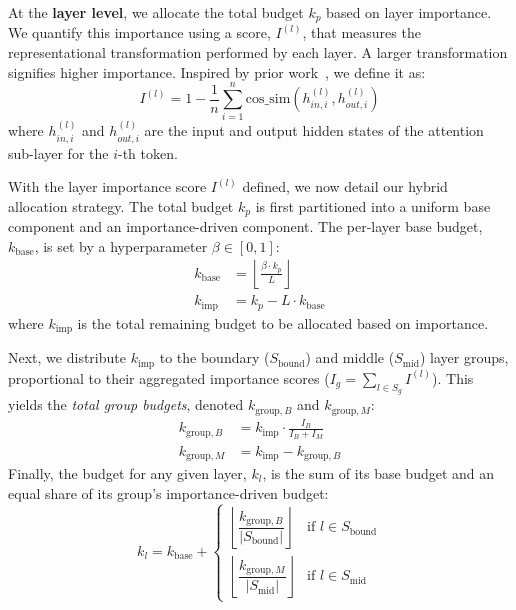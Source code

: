 At the \textbf{layer level}, we allocate the total budget $k_p$ based on layer importance. We quantify this importance using a score, $I^{(l)}$, that measures the representational transformation performed by each layer. A larger transformation signifies higher importance. Inspired by prior work~\citep{wang2024squeezeattention, he2024matters}, we define it as:
\begin{equation}
\label{eq:layer_importance_metric}
    I^{(l)} = 1 - \frac{1}{n} \sum_{i=1}^{n} \text{cos\_sim}\left(h_{in, i}^{(l)}, h_{out, i}^{(l)}\right)
\end{equation}
where $h_{in, i}^{(l)}$ and $h_{out, i}^{(l)}$ are the input and output hidden states of the attention sub-layer for the $i$-th token.

With the layer importance score $I^{(l)}$ defined, we now detail our hybrid allocation strategy. The total budget $k_p$ is first partitioned into a uniform base component and an importance-driven component. The per-layer base budget, $k_{\text{base}}$, is set by a hyperparameter $\beta \in [0,1]$:
\begin{align}
    k_{\text{base}} &= \left\lfloor \frac{\beta \cdot k_p}{L} \right\rfloor \\
    k_{\text{imp}} &= k_p - L \cdot k_{\text{base}}
\end{align}
where $k_{\text{imp}}$ is the total remaining budget to be allocated based on importance. 

Next, we distribute $k_{\text{imp}}$ to the boundary ($S_{\text{bound}}$) and middle ($S_{\text{mid}}$) layer groups, proportional to their aggregated importance scores ($I_g = \sum_{l \in S_g} I^{(l)}$). This yields the \textit{total group budgets}, denoted $k_{\text{group},B}$ and $k_{\text{group},M}$:
\begin{align}
\label{eq:group_budget_allocation}
k_{\text{group},B} &= k_{\text{imp}} \cdot \frac{I_B}{I_B + I_M} \\
k_{\text{group},M} &= k_{\text{imp}} - k_{\text{group},B}
\end{align}
Finally, the budget for any given layer, $k_l$, is the sum of its base budget and an equal share of its group's importance-driven budget:
\begin{equation}
\label{eq:final_layer_budget}
    k_l = k_{\text{base}} + 
    \begin{cases} 
        \left\lfloor \dfrac{k_{\text{group},B}}{|S_{\text{bound}}|} \right\rfloor & \text{if } l \in S_{\text{bound}} \\
        \left\lfloor \dfrac{k_{\text{group},M}}{|S_{\text{mid}}|} \right\rfloor & \text{if } l \in S_{\text{mid}} 
    \end{cases}
\end{equation}

